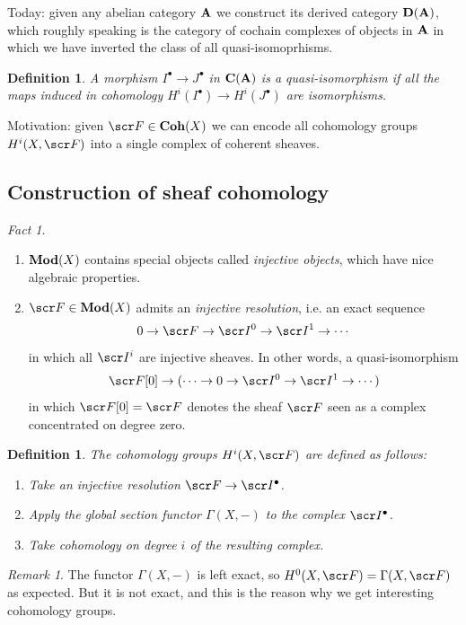 \documentclass[A4paper, british, reqno]{amsart}
\theoremstyle{darkgreentheorem}
\theoremstyle{darkbluedefinition}
\newtheorem{defn}[thm]{Definition}
\theoremstyle{darkredexample}
\theoremstyle{remark}
\newtheorem{rem}[thm]{Remark}
\newtheorem{fact}[thm]{Fact}
\newcommand{\1}{\mathbbm{1}}
\newcommand{\grd}{^{\bullet}}
\begin{document}
Today: given any abelian category $\mathbf{A}$ we construct its derived category $\mathbf{D}(\mathbf{A})$, which roughly speaking is the category of cochain complexes of objects in $\mathbf{A}$ in which we have inverted the class of all quasi-isomoprhisms.

\begin{defn}
    A morphism $I\grd\to J\grd$ in $\mathbf{C}(\mathbf{A})$ is a quasi-isomorphism if all the maps induced in cohomology $H^{i}(I\grd)\to H^{i}(J\grd)$ are isomorphisms.
\end{defn}

Motivation: given $\F\in \Coh(X)$ we can encode all cohomology groups $H^{i}(X,\F)$ into a single complex of coherent sheaves.

\subsection{Construction of sheaf cohomology}

\begin{fact}
    \begin{enumerate}
	\item $\mathbf{Mod}(X)$ contains special objects called \textit{injective objects}, which have nice algebraic properties.
	\item $\F\in \Mod(X)$ admits an \textit{injective resolution}, i.e. an exact sequence
	    \[ 0\to \F\to \I^{0}\to\I^{1}\to \cdots \]
	    in which all $\I^{i}$ are injective sheaves.
	    In other words, a quasi-isomorphism
	    \[ \F[0]\to (\cdots \to 0\to \I^{0}\to \I^{1}\to \cdots) \]
	    in which $\F[0]=\F$ denotes the sheaf $\F$ seen as a complex concentrated on degree zero.
    \end{enumerate}
\end{fact}

\begin{defn}
    The cohomology groups $H^{i}(X,\F)$ are defined as follows:
    \begin{enumerate}
	\item Take an injective resolution $\F\to \I\grd$.
	\item Apply the global section functor $\Gamma(X,-)$ to the complex $\I\grd$.
	\item Take cohomology on degree $i$ of the resulting complex.
    \end{enumerate}
\end{defn}

\begin{rem}
    The functor $\Gamma(X,-)$ is left exact, so $H^{0}(X,\F)=\Gamma(X,\F)$ as expected.
    But it is not exact, and this is the reason why we get interesting cohomology groups.
\end{rem}
\end{document}
